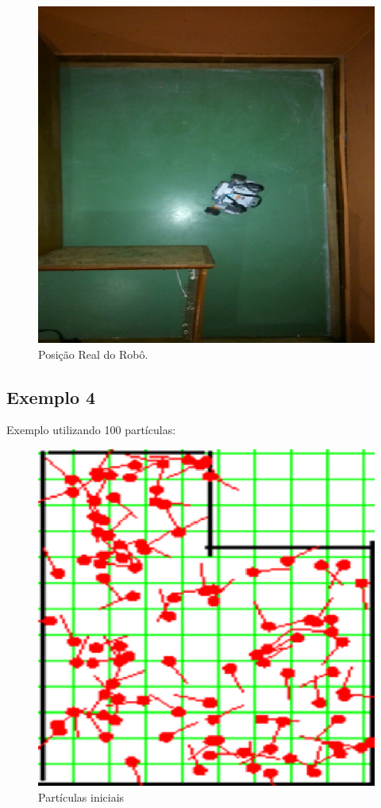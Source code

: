 \begin{figure}[H]
  \centering
  \includegraphics[scale=0.9]{figuras/cen1_ex3/real.eps}
  \caption[Posição Real do Robô]{Posição Real do Robô.}
  \label{img:cen1_ex3_23}
\end{figure}


\subsection{Exemplo 4}

Exemplo utilizando 100 partículas:

\begin{figure}[H]
  \centering
  \includegraphics[scale=0.6]{figuras/cen1_ex4/1.eps}
  \caption[Partículas Iniciais]{Partículas iniciais}
  \label{img:cen1_ex4_1}
\end{figure}

